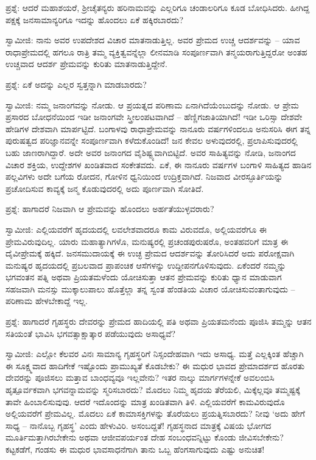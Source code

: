 ಪ್ರಶ್ನೆ: ಆದರೆ ಮಹಾಶಯರೆ, ಶ‍್ರೀಚೈತನ್ಯರು ಹರಿನಾಮವನ್ನು ಎಲ್ಲರಿಗೂ ಚಂಡಾಲರಿಗೂ ಕೂಡ ಬೋಧಿಸಿದರು. ಹೀಗಿದ್ದ ಪಕ್ಷಕ್ಕೆ ಜನಸಾಮಾನ್ಯರಿಗೂ ಇದನ್ನು ಹೊಂದಲು ಏಕೆ ಹಕ್ಕಿರಬಾರದು?

ಸ್ವಾಮೀಜಿ: ನಾನು ಅವರ ಉಪದೇಶದ ವಿಚಾರ ಮಾತನಾಡುತ್ತಿಲ್ಲ. ಅವರ ಪ್ರೇಮದ ಉಚ್ಚ ಆದರ್ಶವನ್ನು – ಯಾವ ರಾಧಾಪ್ರೇಮದಲ್ಲಿ ಹಗಲೂ ರಾತ್ರಿ ತಮ್ಮ ವ್ಯಕ್ತಿತ್ವವನ್ನೆಲ್ಲಾ ಲೀನಮಾಡಿ ಸಂಪೂರ್ಣವಾಗಿ ತನ್ಮಯರಾಗುತ್ತಿದ್ದರೋ ಅಂತಹ ಉಚ್ಚವಾದ ಆದರ್ಶ ಪ್ರೇಮವನ್ನು ಕುರಿತು ಮಾತನಾಡುತ್ತಿದ್ದೇನೆ.

ಪ್ರಶ್ನೆ: ಏಕೆ ಅದನ್ನು ಎಲ್ಲರ ಸ್ವತ್ತನ್ನಾಗಿ ಮಾಡಬಾರದು?

ಸ್ವಾಮೀಜಿ: ನಮ್ಮ ಜನಾಂಗವನ್ನು ನೋಡು. ಆ ಪ್ರಯತ್ನದ ಪರಿಣಾಮ ಏನಾಗಿದೆಯೆಂಬುದನ್ನು ನೋಡು. ಆ ಪ್ರೇಮ ಪ್ರಸಾರದ ಬೋಧನೆಯಿಂದ ಇಡೀ ಜನಾಂಗವೇ ಸ್ತ್ರೀಲಂಪಟವಾಗಿದೆ – ಹೆಣ್ಣಿಗಜಾತಿಯಾಗಿದೆ! ಇಡೀ ಒರಿಸ್ಸಾ ದೇಶವೇ ಹೇಡಿಗಳ ದೇಶವಾಗಿ ಮಾರ್ಪಟ್ಟಿದೆ. ಬಂಗಾಳವು ರಾಧಾಪ್ರೇಮವನ್ನು ನಾನೂರು ವರ್ಷಗಳಿಂದಲೂ ಅನುಸರಿಸಿ ಈಗ ತನ್ನ ಪುರುಷತ್ವದ ಪರಿಜ್ಞಾನವನ್ನೇ ಸಂಪೂರ್ಣವಾಗಿ ಕಳೆದುಕೊಂಡಿದೆ! ಜನ ಕೇವಲ ಅಳುವುದರಲ್ಲಿ, ಪ್ರಲಾಪಿಸುವುದರಲ್ಲಿ ಬಹು ಜಾಣರಾಗಿದ್ದಾರೆ. ಅದೇ ಅವರ ಜನಾಂಗದ ವೈಶಿಷ್ಟ್ಯವಾಗಿಬಿಟ್ಟಿದೆ. ಅವರ ಸಾಹಿತ್ಯವನ್ನು ನೋಡಿ, ಜನಾಂಗದ ವಿಚಾರ ಶಕ್ತಿಯ, ಉದ್ದೇಶಗಳ ಖಂಡಿತವಾದ ಸಂಕೇತವದು. ಏಕೆ, ಈ ನಾನೂರು ವರ್ಷಗಳ ಬಂಗಾಳಿ ಸಾಹಿತ್ಯದ ಹಾಡಿನ ಪಲ್ಲವಿಗಳು ಅದೇ ಬಗೆಯ ರೋದನ, ಗೋಳಿನ ಧ್ವನಿಯಿಂದ ಉದ್ರಿಕ್ತವಾಗಿದೆ. ನಿಜವಾದ ವೀರಸ್ಫೂರ್ತಿಯನ್ನು ಪ್ರಚೋದಿಸುವ ಕಾವ್ಯಕ್ಕೆ ಜನ್ಮ ಕೊಡುವುದರಲ್ಲಿ ಅದು ಪೂರ್ಣವಾಗಿ ಸೋತಿದೆ.

ಪ್ರಶ್ನೆ: ಹಾಗಾದರೆ ನಿಜವಾಗಿ ಆ ಪ್ರೇಮವನ್ನು ಹೊಂದಲು ಅರ್ಹತೆಯುಳ್ಳವರಾರು?

ಸ್ವಾಮೀಜಿ: ಎಲ್ಲಿಯವರೆಗೆ ಹೃದಯದಲ್ಲಿ ಲವಲೇಶವಾದರೂ ಕಾಮ ವಿರುವದೊ, ಅಲ್ಲಿಯವರೆಗೂ ಈ ಪ್ರೇಮವಿರುವುದಿಲ್ಲ. ಯಾರು ಮಹಾತ್ಯಾಗಿಗಳೊ, ಮನುಷ್ಯರಲ್ಲಿ ಪ್ರಚಂಡಪುರುಷರೊ, ಅಂತಹವರಿಗೆ ಮಾತ್ರ ಈ ದೈವೀಪ್ರೇಮಕ್ಕೆ ಹಕ್ಕಿದೆ. ಜನಸಮುದಾಯಕ್ಕೆ ಈ ಉಚ್ಛ ಪ್ರೇಮದ ಆದರ್ಶವನ್ನು ತೋರಿಸಿದರೆ ಅದು ಪರೋಕ್ಷವಾಗಿ ಮನುಷ್ಯರ ಹೃದಯದಲ್ಲಿ ಪ್ರಬಲವಾದ ಪ್ರಾಪಂಚಿಕ ಆಸೆಗಳನ್ನು ಉದ್ದೀಪನಗೊಳಿಸುವುದು. ಏಕೆಂದರೆ ನಮ್ಮನ್ನು ಭಗವಂತನ ಪತ್ನಿ ಅಥವಾ ಪ್ರಿಯತಮಳೆಂದು ಯೋಚಿಸುತ್ತಾ ಆತನ ಪ್ರೇಮವನ್ನು ಕುರಿತು ಧ್ಯಾನ ಮಾಡುವಾಗ ಸಹಜವಾಗಿ ಮನಸ್ಸು ಮುಕ್ಕಾಲುಪಾಲು ಹೊತ್ತೆಲ್ಲಾ ತನ್ನ ಸ್ವಂತ ಹೆಂಡತಿಯ ವಿಚಾರ ಯೋಚಿಸುವಂತಾಗುವುದು – ಪರಿಣಾಮ ಹೇಳಬೇಕಾದ್ದೆ ಇಲ್ಲ.

ಪ್ರಶ್ನೆ: ಹಾಗಾದರೆ ಗೃಹಸ್ಥರು ದೇವರನ್ನು ಪ್ರೇಮದ ಹಾದಿಯಲ್ಲಿ ಪತಿ ಅಥವಾ ಪ್ರಿಯತಮನೆಂದು ಪೂಜಿಸಿ ತಮ್ಮನ್ನು ಆತನ ಸತಿಯಂತೆ ಭಾವಿಸಿ ಭಗವತ್ಸಾಕ್ಷಾತ್ಕಾರ ಪಡೆಯುವುದು ಅಸಾಧ್ಯವೆ?

ಸ್ವಾಮೀಜಿ: ಎಲ್ಲೋ ಕೆಲವರ ವಿನಃ ಸಾಮಾನ್ಯ ಗೃಹಸ್ಥರಿಗೆ ನಿಸ್ಸಂದೇಹವಾಗಿ ಇದು ಅಸಾಧ್ಯ. ಮತ್ತೆ ಎಲ್ಲಕ್ಕಿಂತ ಹೆಚ್ಚಾಗಿ ಈ ಸೂಕ್ಷ್ಮವಾದ ಹಾದಿಗೇಕೆ ಇಷ್ಟೊಂದು ಪ್ರಾಮುಖ್ಯತೆ ಕೊಡಬೇಕು? ಈ ಮಧುರ ಭಾವದ ಪ್ರೇಮಾದರ್ಶದ ಹೊರತು ದೇವರನ್ನು ಪೂಜಿಸಲು ಮತ್ತಾವ ಬಾಂಧವ್ಯವೂ ಇಲ್ಲವೇನು? ಇತರ ನಾಲ್ಕು ಮಾರ್ಗಗಳನ್ನೇಕೆ ಅವಲಂಬಿಸಿ ಹೃತ್ಪೂರ್ವಕವಾಗಿ ಭಗವನ್ನಾಮವನ್ನು ಸ್ಮರಿಸಬಾರದು? ಮೊದಲು ನಿಮ್ಮ ಹೃದಯ ತೆರೆಯಲಿ, ಮಿಕ್ಕೆಲ್ಲವೂ ತಮ್ಮಷ್ಟಕ್ಕೆ ತಾವೇ ಹಿಂಬಾಲಿಸುವುವು. ಆದರೆ ಇದೊಂದನ್ನು ಮಾತ್ರ ಖಂಡಿತವಾಗಿ ತಿಳಿ. ಎಲ್ಲಿಯವರೆಗೆ ಕಾಮವಿರುವುದೊ ಅಲ್ಲಿಯವರೆಗೆ ಪ್ರೇಮವಿಲ್ಲ. ಮೊದಲು ಏಕೆ ಕಾಮಾಸಕ್ತಿಗಳನ್ನು ತೊರೆಯಲು ಪ್ರಯತ್ನಿಸಬಾರದು? ನೀವು ‘ಅದು ಹೇಗೆ ಸಾಧ್ಯ – ನಾನೊಬ್ಬ ಗೃಹಸ್ಥ’ ಎಂದು ಹೇಳುವಿರಿ. ಅಸಂಬದ್ದತೆ! ಗೃಹಸ್ಥನಾದ ಮಾತ್ರಕ್ಕೆ ವಿಷಯ ಭೋಗದ ಮೂರ್ತಿಮತ್ತಾಗಿರಬೇಕೇನು ಅಥವಾ ಆಜೀವಪರ್ಯಂತ ದೇಹ ಸಂಬಂಧವನ್ನಿಟ್ಟು ಕೊಂಡು ಜೀವಿಸಬೇಕೇನು? ಕಟ್ಟಕಡೆಗೆ, ಗಂಡಸು ಈ ಮಧುರ ಭಾವಸಾಧನೆಗಾಗಿ ತಾನು ಒಬ್ಬ ಹೆಂಗಸಾಗುವುದು ಎಷ್ಟು ಅನುಚಿತ!

